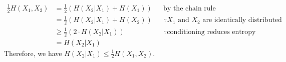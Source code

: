 \documentclass[
  coursecode={MTHE 474},
  assignmentname={Homework \homeworknumber},
  studentnumber=20053722,
  name={Bryan Hoang}
]{
  ltxanswer%
}
\begin{document}
\begin{questions}
\begin{parts}
      \part{}
      \begin{solution}
        \begin{align*}
          \frac{1}{2}H(X_{1},X_{2}) &= \frac{1}{2}(H(X_{2}|X_{1}) + H(X_{1})) & &\text{by the chain rule}                                              \\
                                    &= \frac{1}{2}(H(X_{2}|X_{1}) + H(X_{2})) & &\because X_{1} \text{ and } X_{2} \text{ are identically distributed} \\
                                    &\ge \frac{1}{2}(2 \cdot H(X_{2}|X_{1}))  & &\because \text{conditioning reduces entropy}                          \\
                                    &= H(X_{2}|X_{1})
        \end{align*}
        Therefore, we have \(\boxed{H(X_{2}|X_{1}) \le \frac{1}{2}H(X_{1},X_{2})}\).
      \end{solution}
    \end{parts}
  \end{questions}
\end{document}
